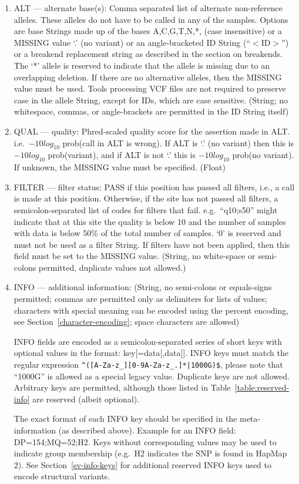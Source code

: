 \documentclass[8pt]{article}
\begin{document}
\begin{enumerate}
  \item ALT --- alternate base(s): Comma separated list of alternate non-reference alleles.
  These alleles do not have to be called in any of the samples.
  Options are base Strings made up of the bases A,C,G,T,N,*, (case insensitive) or a MISSING value `.' (no variant) or an angle-bracketed ID String (``$<$ID$>$'') or a breakend replacement string as described in the section on breakends.
  The `*' allele is reserved to indicate that the allele is missing due to an overlapping deletion.
  If there are no alternative alleles, then the MISSING value must be used.
  Tools processing VCF files are not required to preserve case in the allele String, except for IDs, which are case sensitive.
  (String; no whitespace, commas, or angle-brackets are permitted in the ID String itself)
  \item QUAL --- quality: Phred-scaled quality score for the assertion made in ALT. i.e.\ $-10log_{10}$ prob(call in ALT is wrong).
  If ALT is `.' (no variant) then this is $-10log_{10}$ prob(variant), and if ALT is not `.' this is $-10log_{10}$ prob(no variant).
  If unknown, the MISSING value must be specified. (Float)
  \item FILTER --- filter status: PASS if this position has passed all filters, i.e., a call is made at this position.
  Otherwise, if the site has not passed all filters, a semicolon-separated list of codes for filters that fail. e.g.\ ``q10;s50'' might indicate that at this site the quality is below 10 and the number of samples with data is below 50\% of the total number of samples.
  `0' is reserved and must not be used as a filter String.
  If filters have not been applied, then this field must be set to the MISSING value.
  (String, no white-space or semi-colons permitted, duplicate values not allowed.)
  \item INFO --- additional information: (String, no semi-colons or equals-signs permitted; commas are permitted only as delimiters for lists of values; characters with special meaning can be encoded using the percent encoding, see Section~\ref{character-encoding}; space characters are allowed)

  INFO fields are encoded as a semicolon-separated series of short keys with optional values in the format: key[=data[,data]].
  INFO keys must match the regular expression \texttt{\^{}([A-Za-z\_][0-9A-Za-z\_.]*|1000G)\$}, please note that ``1000G'' is allowed as a special legacy value.
  Duplicate keys are not allowed.
  Arbitrary keys are permitted, although those listed in Table~\ref{table:reserved-info} are reserved (albeit optional).

  The exact format of each INFO key should be specified in the meta-information (as described above).
  Example for an INFO field: DP=154;MQ=52;H2.
  Keys without corresponding values may be used to indicate group membership (e.g.\ H2 indicates the SNP is found in HapMap 2).
  See Section~\ref{sv-info-keys} for additional reserved INFO keys used to encode structural variants.
\end{enumerate}
\end{document}
